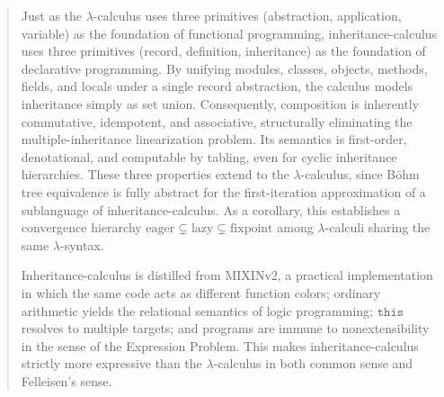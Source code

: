 \begin{abstract}
  Just as the $\lambda$-calculus uses three primitives (abstraction, application, variable) as the foundation of functional programming, inheritance-calculus uses three primitives (record, definition, inheritance) as the foundation of declarative programming. By unifying modules, classes, objects, methods, fields, and locals under a single record abstraction, the calculus models inheritance simply as set union. Consequently, composition is inherently commutative, idempotent, and associative, structurally eliminating the multiple-inheritance linearization problem. Its semantics is first-order, denotational, and computable by tabling, even for cyclic inheritance hierarchies. These three properties extend to the $\lambda$-calculus, since B\"ohm tree equivalence is fully abstract for the first-iteration approximation of a sublanguage of inheritance-calculus. As a corollary, this establishes a convergence hierarchy $\text{eager} \subsetneq \text{lazy} \subsetneq \text{fixpoint}$ among $\lambda$-calculi sharing the same $\lambda$-syntax.

  Inheritance-calculus is distilled from MIXINv2, a practical implementation in which the same code acts as different function colors; ordinary arithmetic yields the relational semantics of logic programming; $\mathtt{this}$ resolves to multiple targets; and programs are immune to nonextensibility in the sense of the Expression Problem. This makes inheritance-calculus strictly more expressive than the $\lambda$-calculus in both common sense and Felleisen's sense.
\end{abstract}

